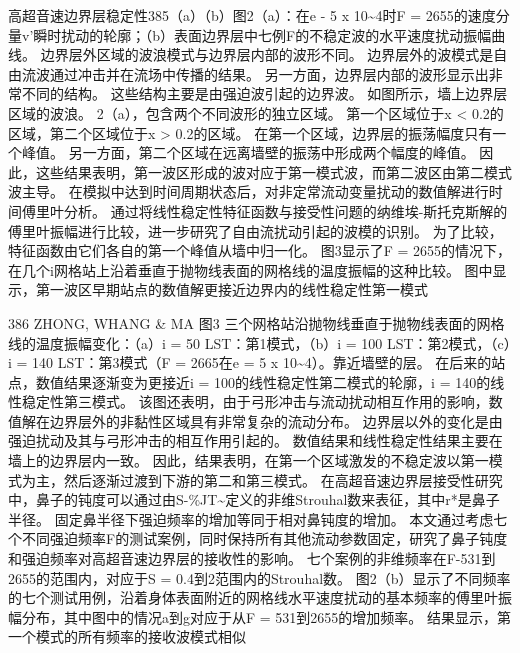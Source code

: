 \documentclass[UTF8,11pt,a4paper,openany,fontset=fandol]{ctexbook}
\begin{document}
高超音速边界层稳定性385（a）（b）图2（a）：在e - 5 x 10\textasciitilde{}4时F = 2655的速度分量v'瞬时扰动的轮廓；（b）表面边界层中七例F的不稳定波的水平速度扰动振幅曲线。 边界层外区域的波浪模式与边界层内部的波形不同。 边界层外的波模式是自由流波通过冲击并在流场中传播的结果。 另一方面，边界层内部的波形显示出非常不同的结构。 这些结构主要是由强迫波引起的边界波。 如图所示，墙上边界层区域的波浪。 2（a），包含两个不同波形的独立区域。 第一个区域位于x < 0.2的区域，第二个区域位于x > 0.2的区域。 在第一个区域，边界层的振荡幅度只有一个峰值。 另一方面，第二个区域在远离墙壁的振荡中形成两个幅度的峰值。 因此，这些结果表明，第一波区形成的波对应于第一模式波，而第二波区由第二模式波主导。 在模拟中达到时间周期状态后，对非定常流动变量扰动的数值解进行时间傅里叶分析。 通过将线性稳定性特征函数与接受性问题的纳维埃-斯托克斯解的傅里叶振幅进行比较，进一步研究了自由流扰动引起的波模的识别。 为了比较，特征函数由它们各自的第一个峰值从墙中归一化。 图3显示了F = 2655的情况下，在几个i网格站上沿着垂直于抛物线表面的网格线的温度振幅的这种比较。 图中显示，第一波区早期站点的数值解更接近边界内的线性稳定性第一模式

386 ZHONG, WHANG \& MA 图3 三个网格站沿抛物线垂直于抛物线表面的网格线的温度振幅变化：（a）i = 50 LST：第1模式，（b）i = 100 LST：第2模式，（c）i = 140 LST：第3模式（F = 2665在e = 5 x 10\textasciitilde{}4）。靠近墙壁的层。 在后来的站点，数值结果逐渐变为更接近i = 100的线性稳定性第二模式的轮廓，i = 140的线性稳定性第三模式。 该图还表明，由于弓形冲击与流动扰动相互作用的影响，数值解在边界层外的非黏性区域具有非常复杂的流动分布。 边界层以外的变化是由强迫扰动及其与弓形冲击的相互作用引起的。 数值结果和线性稳定性结果主要在墙上的边界层内一致。 因此，结果表明，在第一个区域激发的不稳定波以第一模式为主，然后逐渐过渡到下游的第二和第三模式。 在高超音速边界层接受性研究中，鼻子的钝度可以通过由S-\%JT\textasciitilde{}定义的非维Strouhal数来表征，其中r*是鼻子半径。 固定鼻半径下强迫频率的增加等同于相对鼻钝度的增加。 本文通过考虑七个不同强迫频率F的测试案例，同时保持所有其他流动参数固定，研究了鼻子钝度和强迫频率对高超音速边界层的接收性的影响。 七个案例的非维频率在F-531到2655的范围内，对应于S = 0.4到2范围内的Strouhal数。 图2（b）显示了不同频率的七个测试用例，沿着身体表面附近的网格线水平速度扰动的基本频率的傅里叶振幅分布，其中图中的情况a到g对应于从F = 531到2655的增加频率。 结果显示，第一个模式的所有频率的接收波模式相似
\end{document}
